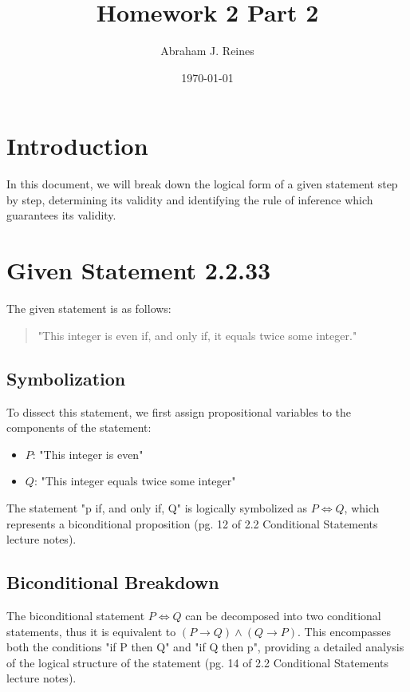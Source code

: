 \documentclass[12pt]{article}
\begin{document}
\doublespacing

\title{Homework 2 Part 2}
\author{Abraham J. Reines}
\date{\today}
\maketitle

\section*{Introduction}
In this document, we will break down the logical form of a given statement step by step, determining its validity and identifying the rule of inference which guarantees its validity.

\section*{Given Statement 2.2.33}

The given statement is as follows:
\begin{quote}
"This integer is even if, and only if, it equals twice some integer."
\end{quote}

\subsection*{Symbolization}
To dissect this statement, we first assign propositional variables to the components of the statement:
\begin{itemize}
    \item \( P \): "This integer is even"
    \item \( Q \): "This integer equals twice some integer"
\end{itemize}

The statement "p if, and only if, Q" is logically symbolized as \( P \iff Q \), which represents a biconditional proposition (pg. 12 of 2.2 Conditional Statements lecture notes).

\subsection*{Biconditional Breakdown}
The biconditional statement \( P \iff Q \) can be decomposed into two conditional statements, thus it is equivalent to \( (P \rightarrow Q) \land (Q \rightarrow P) \). This encompasses both the conditions "if P then Q" and "if Q then p", providing a detailed analysis of the logical structure of the statement (pg. 14 of 2.2 Conditional Statements lecture notes).
\end{document}
